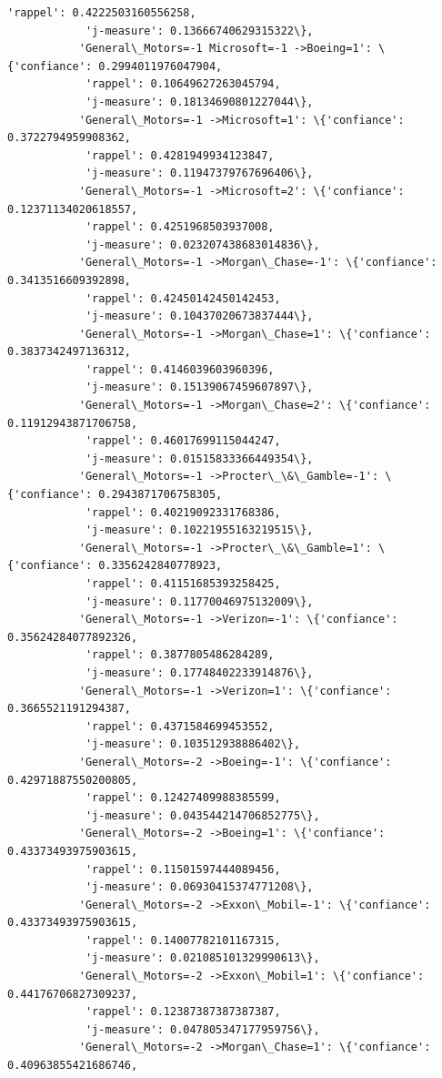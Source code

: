\documentclass[11pt]{article}
\begin{document}
\begin{Verbatim}[commandchars=\\\{\}]
            'rappel': 0.4222503160556258,
            'j-measure': 0.13666740629315322\},
           'General\_Motors=-1 Microsoft=-1 ->Boeing=1': \{'confiance': 0.2994011976047904,
            'rappel': 0.10649627263045794,
            'j-measure': 0.18134690801227044\},
           'General\_Motors=-1 ->Microsoft=1': \{'confiance': 0.3722794959908362,
            'rappel': 0.4281949934123847,
            'j-measure': 0.11947379767696406\},
           'General\_Motors=-1 ->Microsoft=2': \{'confiance': 0.12371134020618557,
            'rappel': 0.4251968503937008,
            'j-measure': 0.023207438683014836\},
           'General\_Motors=-1 ->Morgan\_Chase=-1': \{'confiance': 0.3413516609392898,
            'rappel': 0.42450142450142453,
            'j-measure': 0.10437020673837444\},
           'General\_Motors=-1 ->Morgan\_Chase=1': \{'confiance': 0.3837342497136312,
            'rappel': 0.4146039603960396,
            'j-measure': 0.15139067459607897\},
           'General\_Motors=-1 ->Morgan\_Chase=2': \{'confiance': 0.11912943871706758,
            'rappel': 0.46017699115044247,
            'j-measure': 0.01515833366449354\},
           'General\_Motors=-1 ->Procter\_\&\_Gamble=-1': \{'confiance': 0.2943871706758305,
            'rappel': 0.40219092331768386,
            'j-measure': 0.10221955163219515\},
           'General\_Motors=-1 ->Procter\_\&\_Gamble=1': \{'confiance': 0.3356242840778923,
            'rappel': 0.41151685393258425,
            'j-measure': 0.11770046975132009\},
           'General\_Motors=-1 ->Verizon=-1': \{'confiance': 0.35624284077892326,
            'rappel': 0.3877805486284289,
            'j-measure': 0.17748402233914876\},
           'General\_Motors=-1 ->Verizon=1': \{'confiance': 0.3665521191294387,
            'rappel': 0.4371584699453552,
            'j-measure': 0.103512938886402\},
           'General\_Motors=-2 ->Boeing=-1': \{'confiance': 0.42971887550200805,
            'rappel': 0.12427409988385599,
            'j-measure': 0.043544214706852775\},
           'General\_Motors=-2 ->Boeing=1': \{'confiance': 0.43373493975903615,
            'rappel': 0.11501597444089456,
            'j-measure': 0.06930415374771208\},
           'General\_Motors=-2 ->Exxon\_Mobil=-1': \{'confiance': 0.43373493975903615,
            'rappel': 0.14007782101167315,
            'j-measure': 0.021085101329990613\},
           'General\_Motors=-2 ->Exxon\_Mobil=1': \{'confiance': 0.44176706827309237,
            'rappel': 0.12387387387387387,
            'j-measure': 0.047805347177959756\},
           'General\_Motors=-2 ->Morgan\_Chase=1': \{'confiance': 0.40963855421686746,

\end{Verbatim}
\end{document}
